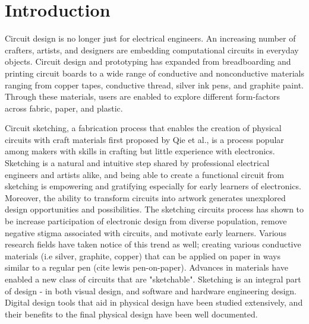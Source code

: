 \documentclass{sigchi}
\begin{document}

\section{Introduction}

Circuit design is no longer just for electrical engineers. An increasing number of crafters, artists, and designers are embedding computational circuits in everyday objects.  Circuit design and prototyping has expanded from breadboarding and printing circuit boards to a wide range of conductive and nonconductive materials ranging from copper tapes, conductive thread, silver ink pens, and graphite paint. Through these materials, users are enabled to explore different form-factors across fabric, paper, and plastic. 

Circuit sketching, a fabrication process that enables the creation of physical circuits with craft materials first proposed by Qie et al., is a process popular among makers with skills in crafting but little experience with electronics. Sketching is a natural and intuitive step shared by professional electrical engineers and artists alike, and being able to create a functional circuit from sketching is empowering and gratifying especially for early learners of electronics. Moreover, the ability to transform circuits into artwork generates unexplored design opportunities and possibilities.  The sketching circuits process has shown to be increase participation of electronic design from diverse population, remove negative stigma associated with circuits, and motivate early learners. Various research fields have taken notice of this trend as well; creating various conductive materials (i.e silver, graphite, copper) that can be applied on paper in ways similar to a regular pen (cite lewis pen-on-paper). Advances in materials have enabled a new class of circuits that are "sketchable". Sketching is an integral part of design - in both visual design, and software and hardware engineering design. Digital design tools that aid in physical design have been studied extensively, and their benefits to the final physical design have been well documented.
\end{document}
